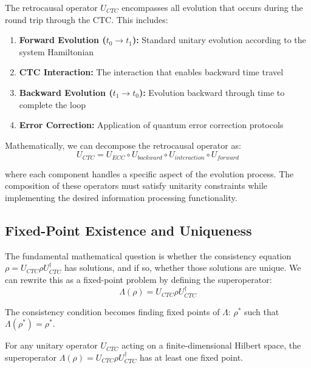 \documentclass[12pt,a4paper]{article}
\begin{document}
The retrocausal operator $U_{CTC}$ encompasses all evolution that occurs during the round trip through the CTC. This includes:

\begin{enumerate}
\item \textbf{Forward Evolution ($t_0 \rightarrow t_1$):} Standard unitary evolution according to the system Hamiltonian
\item \textbf{CTC Interaction:} The interaction that enables backward time travel
\item \textbf{Backward Evolution ($t_1 \rightarrow t_0$):} Evolution backward through time to complete the loop
\item \textbf{Error Correction:} Application of quantum error correction protocols
\end{enumerate}

Mathematically, we can decompose the retrocausal operator as:
\begin{equation}
U_{CTC} = U_{ECC} \circ U_{backward} \circ U_{interaction} \circ U_{forward}
\end{equation}

where each component handles a specific aspect of the evolution process. The composition of these operators must satisfy unitarity constraints while implementing the desired information processing functionality.

\subsection{Fixed-Point Existence and Uniqueness}

The fundamental mathematical question is whether the consistency equation $\rho = U_{CTC} \rho U_{CTC}^\dagger$ has solutions, and if so, whether those solutions are unique. We can rewrite this as a fixed-point problem by defining the superoperator:
\begin{equation}
\Lambda(\rho) = U_{CTC} \rho U_{CTC}^\dagger
\end{equation}

The consistency condition becomes finding fixed points of $\Lambda$: $\rho^*$ such that $\Lambda(\rho^*) = \rho^*$.

\begin{theorem}[Existence]
For any unitary operator $U_{CTC}$ acting on a finite-dimensional Hilbert space, the superoperator $\Lambda(\rho) = U_{CTC} \rho U_{CTC}^\dagger$ has at least one fixed point.
\end{theorem}
\end{document}
